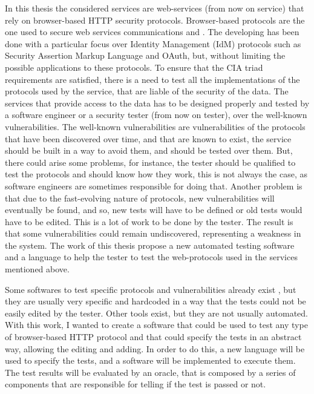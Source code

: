 In this thesis the considered services are web-services (from now on service) that rely on browser-based HTTP security protocols. Browser-based protocols are the one used to secure web services communications and . The developing has been done with a particular focus over Identity Management (IdM) protocols such as Security Assertion Markup Language and OAuth, but, without limiting the possible applications to these protocols.
To ensure that the CIA triad requirements are satisfied, there is a need to test all the implementations of the protocols used by the service, that are liable of the security of the data. The services that provide access to the data has to be designed properly and tested by a software engineer or a security tester (from now on tester), over the well-known vulnerabilities. The well-known vulnerabilities are vulnerabilities of the protocols that have been discovered over time, and that are known to exist, the service should be built in a way to avoid them, and should be tested over them. But, there could arise some problems, for instance, the tester should be qualified to test the protocols and should know how they work, this is not always the case, as software engineers are sometimes responsible for doing that. Another problem is that due to the fast-evolving nature of protocols, new vulnerabilities will eventually be found, and so, new tests will have to be defined or old tests would have to be edited. This is a lot of work to be done by the tester. The result is that some vulnerabilities could remain undiscovered, representing a weakness in the system. The work of this thesis propose a new automated testing software and a language to help the tester to test the web-protocols used in the services mentioned above. 

Some softwares to test specific protocols and vulnerabilities already exist \cite{wendy_barreto,claudio_grisenti}, but they are usually very specific and hardcoded in a way that the tests could not be easily edited by the tester. Other tools exist, but they are not usually automated. With this work, I wanted to create a software that could be used to test any type of browser-based HTTP protocol and that could specify the tests in an abstract way, allowing the editing and adding. In order to do this, a new language will be used to specify the tests, and a software will be implemented to execute them. The test results will be evaluated by an oracle, that is composed by a series of components that are responsible for telling if the test is passed or not.

